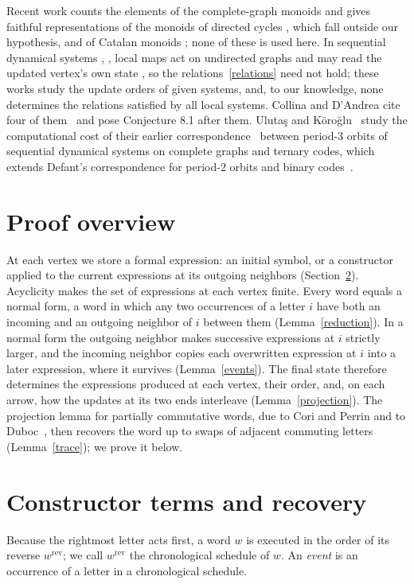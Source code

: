 \documentclass[11pt]{article}
\begin{document}
Recent work counts the elements of the complete-graph monoids
\cite[Theorems 2.1 and 3.2]{DS} and gives faithful representations of the
monoids of directed cycles \cite[abstract]{JLZ}, which fall outside our
hypothesis, and of Catalan monoids \cite[abstract]{LJZ}; none of these is
used here. In sequential dynamical systems
\cite{BR,BMR2,BMR3,MRdm,Reidys,GJL}, \cite[Chapter 7]{MR}, local maps act on
undirected graphs and may read the updated vertex's own state
\cite[Definition 2.1]{GJL}, so the relations~\eqref{relations} need not
hold; these works study the update orders of given systems, and, to our
knowledge, none determines the relations satisfied by all local systems.
Collina and D'Andrea cite four of them~\cite{BR,BMR2,BMR3,MR} and pose
Conjecture 8.1 after them. Uluta\c{s} and K\"oro\u{g}lu~\cite{UK} study the
computational cost of their earlier correspondence~\cite{UK0} between
period-3 orbits of sequential dynamical systems on complete graphs and
ternary codes, which extends Defant's correspondence for period-2 orbits and
binary codes~\cite{Defant}.

\section{Proof overview}
At each vertex we store a formal expression: an initial symbol, or a
constructor applied to the current expressions at its outgoing neighbors
(Section~\ref{sec:terms}). Acyclicity makes the set of expressions at each
vertex finite. Every word equals a normal form, a word in which any two
occurrences of a letter $i$ have both an incoming and an outgoing neighbor
of $i$ between them (Lemma~\ref{reduction}). In a normal form the outgoing
neighbor makes successive expressions at $i$ strictly larger, and the
incoming neighbor copies each overwritten expression at $i$ into a later
expression, where it survives (Lemma~\ref{events}). The final state
therefore determines the expressions produced at each vertex, their order,
and, on each arrow, how the updates at its two ends interleave
(Lemma~\ref{projection}). The projection lemma for partially commutative
words, due to Cori and Perrin and to Duboc~\cite{CP,Duboc}, then recovers
the word up to swaps of adjacent commuting letters (Lemma~\ref{trace}); we
prove it below.

\section{Constructor terms and recovery}\label{sec:terms}
Because the rightmost letter acts first, a word $w$ is executed in the
order of its reverse $w^{\mathrm{rev}}$; we call $w^{\mathrm{rev}}$ the
chronological schedule of $w$. An \emph{event} is an occurrence of a letter
in a chronological schedule.
\end{document}
